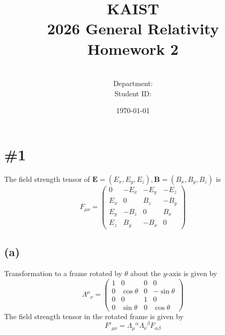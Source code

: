 \documentclass[a4paper,11pt]{article}
\title{KAIST\\2026 General Relativity\\
Homework 2\bigskip}
\author{\textbf{\Large \name} \\
Department: \department\\
Student ID: \studentid}
\date{\today}
\begin{document}
\thispagestyle{empty}
\maketitle
\tableofcontents
{}
\setcounter{secnumdepth}{1}
\setcounter{tocdepth}{2}

\newcommand{\tr}{\operatorname{tr}}
\newcommand{\sgn}{\operatorname{sgn}}
\newcommand{\supp}{\operatorname{supp}}
\newcommand{\id}{\operatorname{id}}
\renewcommand{\Re}{\operatorname{Re}}
\renewcommand{\Im}{\operatorname{Im}}
\newcommand{\boltz}{k_{\mathrm{B}}}

\section{\#1}

The field strength tensor of $\mathbf{E}=(E_x, E_y, E_z), \mathbf{B}=(B_x, B_y, B_z)$ is
\begin{equation}
    F_{\mu\nu} = \begin{pmatrix}
        0 & -E_x & -E_y & -E_z \\
        E_x & 0 & B_z & -B_y \\
        E_y & -B_z & 0 & B_x \\
        E_z & B_y & -B_x & 0
    \end{pmatrix}
\end{equation}


\subsection{(a)} Transformation to a frame rotated by $\theta$ about the $y$-axis is given by
\begin{equation}
    \Lambda^\mu{}_\nu =
    \begin{pmatrix}
        1 & 0 & 0 & 0 \\
        0 & \cos\theta & 0 & -\sin\theta \\
        0 & 0 & 1 & 0 \\
        0 & \sin\theta & 0 & \cos\theta
    \end{pmatrix}
\end{equation}
The field strength tensor in the rotated frame is given by
\begin{equation}
    F'_{\mu\nu} = \Lambda_\mu{}^\alpha \Lambda_\nu{}^\beta F_{\alpha\beta} \label{eq:1a1}
\end{equation}
\end{document}
